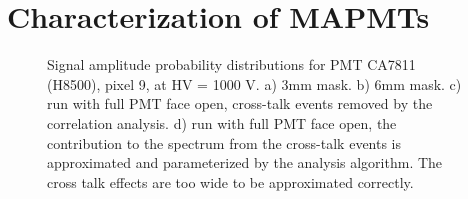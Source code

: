 \section{Characterization of MAPMTs}

\begin{figure}[hbt] 
\centering 
  \caption{Signal amplitude probability distributions for PMT CA7811 (H8500), pixel 9, at HV = 1000 V. a) 3mm mask. b) 6mm mask. c) run with full PMT face open, cross-talk events removed by the correlation analysis. d) run with full PMT face open, the contribution to the spectrum from the cross-talk events is approximated and parameterized by the analysis algorithm. The cross talk effects are too wide to be approximated correctly.
    }
\label{fig:CA7811}
\end{figure}

